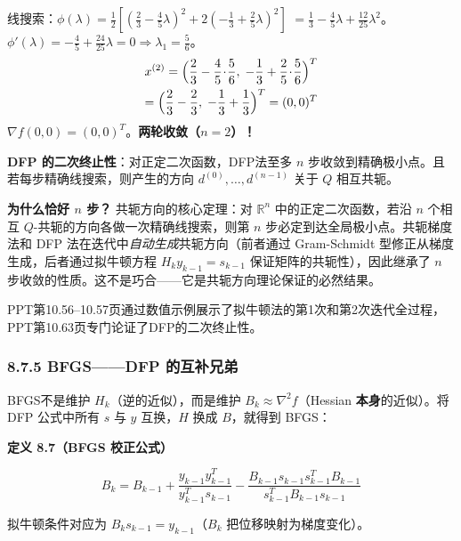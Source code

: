 {线搜索：$\phi(\lambda) = \tfrac{1}{2}[(\tfrac{2}{3}-\tfrac{4}{5}\lambda)^2 + 2(-\tfrac{1}{3}+\tfrac{2}{5}\lambda)^2]$
$= \tfrac{1}{3} - \tfrac{4}{5}\lambda + \tfrac{12}{25}\lambda^2$。
$\phi'(\lambda) = -\tfrac{4}{5} + \tfrac{24}{25}\lambda = 0 \Rightarrow \lambda_1 = \tfrac{5}{6}$。
\begin{multline*}
x^{(2)} = \Bigl(\frac{2}{3}-\frac{4}{5}\!\cdot\!\frac{5}{6},\;
                 -\frac{1}{3}+\frac{2}{5}\!\cdot\!\frac{5}{6}\Bigr)^T \\
        = \Bigl(\frac{2}{3}-\frac{2}{3},\; -\frac{1}{3}+\frac{1}{3}\Bigr)^T
        = (0, 0)^T
\end{multline*}
$\nabla f(0,0) = (0,0)^T$。\textbf{两轮收敛（$n=2$）！}}

\begin{defbox}
\textbf{DFP 的二次终止性}：对正定二次函数，DFP法至多 $n$ 步收敛到精确极小点。且若每步精确线搜索，则产生的方向 $d^{(0)},\dots,d^{(n-1)}$ 关于 $Q$ 相互共轭。

\textbf{为什么恰好 $n$ 步？} 共轭方向的核心定理：对 $\mathbb{R}^n$ 中的正定二次函数，若沿 $n$ 个相互 $Q$-共轭的方向各做一次精确线搜索，则第 $n$ 步必定到达全局极小点。共轭梯度法和 DFP 法在迭代中\emph{自动生成}共轭方向（前者通过 Gram-Schmidt 型修正从梯度生成，后者通过拟牛顿方程 $H_k y_{k-1} = s_{k-1}$ 保证矩阵的共轭性），因此继承了 $n$ 步收敛的性质。这不是巧合——它是共轭方向理论保证的必然结果。
\end{defbox}

PPT第10.56--10.57页通过数值示例展示了拟牛顿法的第1次和第2次迭代全过程，PPT第10.63页专门论证了DFP的二次终止性。

\smallskip
{}
\smallskip
{}
\newpage
{}
\smallskip

\subsubsection{8.7.5 BFGS——DFP 的互补兄弟}

BFGS不是维护 $H_k$（逆的近似），而是维护 $B_k \approx \nabla^2 f$（Hessian \textbf{本身}的近似）。将 DFP 公式中所有 $s$ 与 $y$ 互换，$H$ 换成 $B$，就得到 BFGS：

\begin{defbox}
\textbf{定义 8.7（BFGS 校正公式）}

\[
B_k = B_{k-1}
    + \frac{y_{k-1} y_{k-1}^T}{y_{k-1}^T s_{k-1}}
    - \frac{B_{k-1} s_{k-1} s_{k-1}^T B_{k-1}}{s_{k-1}^T B_{k-1} s_{k-1}}
\]

拟牛顿条件对应为 $B_k s_{k-1} = y_{k-1}$（$B_k$ 把位移映射为梯度变化）。
\end{defbox}

